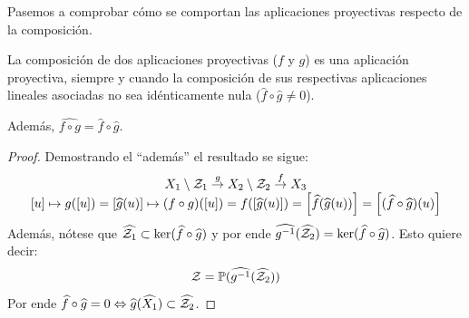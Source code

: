 Pasemos a comprobar cómo se comportan las aplicaciones proyectivas respecto de la composición.
\begin{lem}
	\label{C4_lem_composicionProyectivas}
	La composición de dos aplicaciones proyectivas ($f$ y $g$) es una aplicación proyectiva, siempre y cuando la composición de sus respectivas aplicaciones lineales asociadas no sea idénticamente nula ($\widehat{f}\circ \widehat{g}\not=0$).
	
	Además, $\widehat{f\circ g}=\widehat{f}\circ\widehat{g}$.
\end{lem}
\begin{proof}
	Demostrando el ``además'' el resultado se sigue:
	\[\begin{array}{c}X_1\setminus\mathcal{Z}_1 \stackrel{g}{\to} X_2\setminus\mathcal{Z}_2 \stackrel{f}{\to} X_3\\
	\left [ u \right ] \mapsto g(\left [ u \right ])=\left [ \widehat{g}(u) \right ] \mapsto (f\circ g)(\left [ u \right ])=f(\left [ \widehat{g}(u) \right ])=\left [ \widehat{f}(\widehat{g}(u)) \right ]=\left [ (\widehat{f}\circ\widehat{g})(u) \right ]
	\end{array}\]
	Además, nótese que $\widehat{\mathcal{Z}_1}\subset\ker(\widehat{f}\circ\widehat{g})$ y por ende $\widehat{g^{-1}}(\widehat{\mathcal{Z}_2})=\ker(\widehat{f}\circ\widehat{g})$. Esto quiere decir:
	\[\mathcal{Z}=\mathbb{P}(\widehat{g^{-1}}(\widehat{\mathcal{Z}_2}))\]
	Por ende $\widehat{f}\circ \widehat{g}=0\Leftrightarrow \widehat{g}(\widehat{X_1})\subset\widehat{\mathcal{Z}_2}$.
\end{proof}

